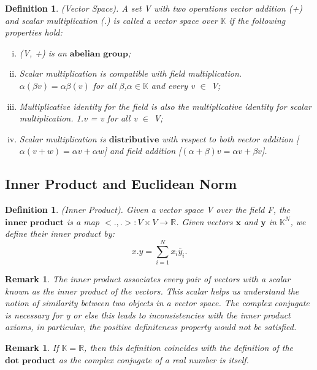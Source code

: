 \documentclass[twoside]{article}
\newtheorem{remark}[theorem]{Remark}
\newtheorem{definition}[theorem]{Definition}
\begin{document}
\begin{definition}
(Vector Space). A set V with two operations vector addition (+) and scalar multiplication (.) is called a vector space over $\mathbb{K}$ if the following properties hold:

\begin{enumerate}[(i)]
  \item (V, +) is an $\textbf{abelian group}$;
  \item Scalar multiplication is compatible with field multiplication. $\alpha(\beta v) = \alpha\beta(v)$ for all $\beta$,$\alpha \in \mathbb{K}$ and every v $\in$ V;
  \item Multiplicative identity for the field is also the multiplicative identity for scalar multiplication. 1.v = v for all v $\in$ V;
  \item Scalar multiplication is $\textbf{distributive}$ with respect to both vector addition [$\alpha(v + w) = \alpha v + \alpha w$] and field addition [$(\alpha + \beta)v = \alpha v + \beta v$]. 
\end{enumerate}

\end{definition}

\subsection{Inner Product and Euclidean Norm}

\begin{definition}
(Inner Product). Given a vector space V over the field F, the $\textbf{inner  product}$ is a map $<.,.>: V \times V \rightarrow \mathbb{R}$. Given vectors $\mathbf{x}$ and $\mathbf{y}$ in $\mathbb{K}^N$, we define their inner product by:
$$
x . y = \sum_{i=1}^{N}x_i\bar{y}_i.
$$
\end{definition}

\begin{remark}
The inner product associates every pair of vectors with a scalar known as the inner product of the vectors. This scalar helps us understand the notion of similarity between two objects in a vector space. The complex conjugate is necessary for y or else this leads to inconsistencies with the inner product axioms, in particular, the positive definiteness property would not be satisfied.
\end{remark}

\begin{remark}
If $\mathbb{K} = \mathbb{R}$, then this definition coincides with the definition of the $\textbf{dot product}$ as the complex conjugate of a real number is itself.
\end{remark}
\end{document}
